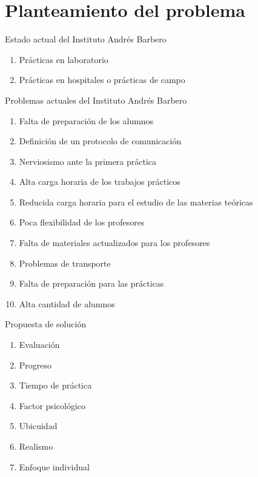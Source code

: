 \section{Planteamiento del problema}

\begin{frame}{Estado actual del Instituto Andrés Barbero}


    
	\begin{enumerate}[<+->]
	\item Prácticas en laboratorio
	\item Prácticas en hospitales o prácticas de campo
	\end{enumerate}
\end{frame}

\begin{frame}{Problemas actuales del Instituto Andrés Barbero}
	\begin{enumerate}[<+->]
	\item Falta de preparación de los alumnos
	\item Definición de un protocolo de comunicación
	\item Nerviosismo ante la primera práctica
	\item Alta carga horaria de los trabajos prácticos
	\item Reducida carga horaria para el estudio de las materias teóricas
	\item Poca flexibilidad de los profesores
	\item Falta de materiales actualizados para los profesores
	\item Problemas de transporte
	\item Falta de preparación para las prácticas
	\item Alta cantidad de alumnos
	\end{enumerate}
\end{frame}

\begin{frame}{Propuesta de solución}
	\begin{enumerate}[<+->]
	\item Evaluación
	\item Progreso
	\item Tiempo de práctica
	\item Factor psicológico
	\item Ubicuidad
	\item Realismo
	\item Enfoque individual
	\end{enumerate}
\end{frame}

